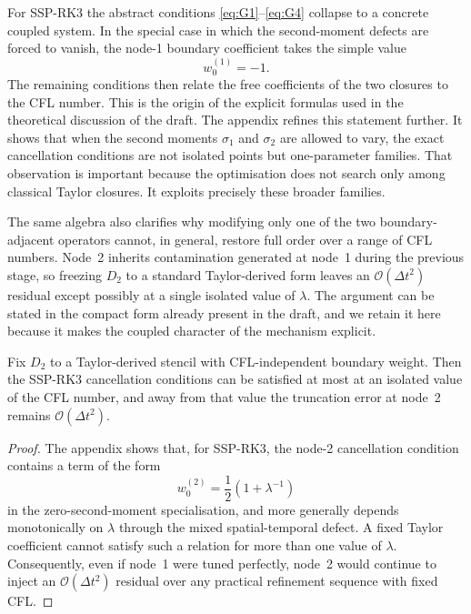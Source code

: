 \documentclass[review,hidelinks,onefignum,onetabnum]{siamart251216}
\newcommand{\Dt}{\Delta t}
\newcommand{\Order}[1]{\mathcal{O}\!\left(#1\right)}
\begin{document}
For SSP-RK3 the abstract conditions \eqref{eq:G1}--\eqref{eq:G4} collapse to a concrete coupled system. In the special case in which the second-moment defects are forced to vanish, the node-1 boundary coefficient takes the simple value
\begin{equation}
  w_0^{(1)}=-1.
  \label{eq:C1-main}
\end{equation}
The remaining conditions then relate the free coefficients of the two closures to the CFL number. This is the origin of the explicit formulas used in the theoretical discussion of the draft. The appendix refines this statement further. It shows that when the second moments $\sigma_1$ and $\sigma_2$ are allowed to vary, the exact cancellation conditions are not isolated points but one-parameter families. That observation is important because the optimisation does not search only among classical Taylor closures. It exploits precisely these broader families.

The same algebra also clarifies why modifying only one of the two boundary-adjacent operators cannot, in general, restore full order over a range of CFL numbers. Node~2 inherits contamination generated at node~1 during the previous stage, so freezing $D_2$ to a standard Taylor-derived form leaves an $\Order{\Dt^2}$ residual except possibly at a single isolated value of $\lambda$. The argument can be stated in the compact form already present in the draft, and we retain it here because it makes the coupled character of the mechanism explicit.

\begin{proposition}
\label{prop:single-node}
Fix $D_2$ to a Taylor-derived stencil with CFL-independent boundary weight. Then the SSP-RK3 cancellation conditions can be satisfied at most at an isolated value of the CFL number, and away from that value the truncation error at node~2 remains $\Order{\Dt^2}$.
\end{proposition}

\begin{proof}
The appendix shows that, for SSP-RK3, the node-2 cancellation condition contains a term of the form
\[
w_0^{(2)}=\frac{1}{2}\left(1+\lambda^{-1}\right)
\]
in the zero-second-moment specialisation, and more generally depends monotonically on $\lambda$ through the mixed spatial-temporal defect. A fixed Taylor coefficient cannot satisfy such a relation for more than one value of $\lambda$. Consequently, even if node~1 were tuned perfectly, node~2 would continue to inject an $\Order{\Dt^2}$ residual over any practical refinement sequence with fixed CFL.
\end{proof}
\end{document}
